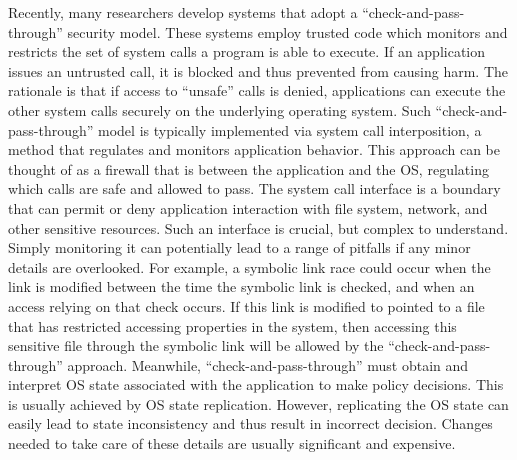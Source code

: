 

\par
Recently, many researchers develop systems that adopt a
``check-and-pass-through'' security model. These systems employ trusted
code which monitors and restricts the set of system calls a program is able
to execute. If an application issues an untrusted call, it is blocked and
thus prevented from causing harm. The rationale is that if access to
``unsafe'' calls is denied, applications can execute the other system calls
securely on the underlying operating system. Such
``check-and-pass-through'' model is typically implemented via system call
interposition, a method that regulates and monitors application behavior.
This approach can be thought of as a firewall that is between the
application and the OS, regulating which calls are safe and allowed to
pass. The system call interface is a boundary that can permit or deny
application interaction with file system, network, and other sensitive
resources. Such an interface is crucial, but complex to understand. Simply
monitoring it can potentially lead to a range of pitfalls if any minor
details are overlooked. For example, a symbolic link race could occur when
the link is modified between the time the symbolic link is checked, and
when an access relying on that check occurs. If this link is modified to
pointed to a file that has restricted accessing properties in the system,
then accessing this sensitive file through the symbolic link will be
allowed by the ``check-and-pass-through'' approach. Meanwhile,
``check-and-pass-through'' must obtain and interpret OS state associated
with the application to make policy decisions. This is usually achieved by
OS state replication. However, replicating the OS state can easily lead to
state inconsistency and thus result in incorrect decision. Changes needed
to take care of these details are usually significant and expensive.


